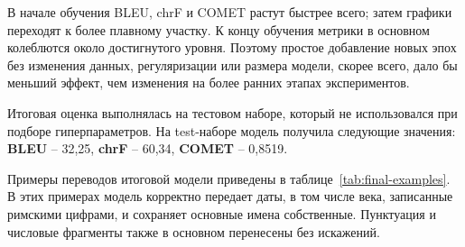 В начале обучения BLEU, chrF и COMET растут быстрее всего; затем графики переходят к более плавному участку. К концу обучения метрики в основном колеблются около достигнутого уровня. Поэтому простое добавление новых эпох без изменения данных, регуляризации или размера модели, скорее всего, дало бы меньший эффект, чем изменения на более ранних этапах экспериментов.

Итоговая оценка выполнялась на тестовом наборе, который не использовался при подборе гиперпараметров. На test-наборе модель получила следующие значения: \textbf{BLEU} -- 32{,}25, \textbf{chrF} -- 60{,}34, \textbf{COMET} -- 0{,}8519.

Примеры переводов итоговой модели приведены в таблице~\ref{tab:final-examples}.
В этих примерах модель корректно передает даты, в том числе века, записанные римскими цифрами, и сохраняет основные имена собственные.
Пунктуация и числовые фрагменты также в основном перенесены без искажений.

